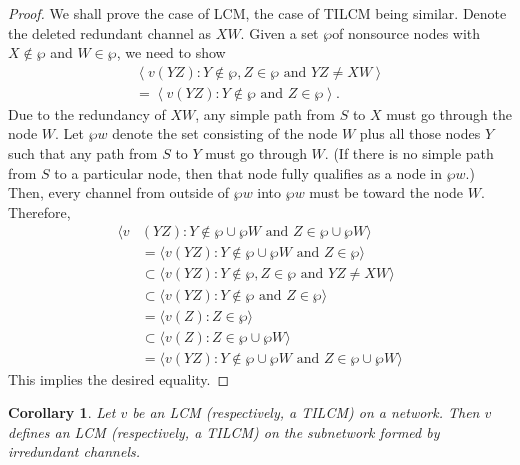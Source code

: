 \documentclass[journal]{IEEEtran}
\newtheorem*{proof}{\hskip 2em Proof}
\newtheorem{coro}[prop]{Corollary}
\begin{document}
\begin{proof}
	We shall prove the case of LCM, the case of TILCM being similar. Denote the deleted redundant channel as $XW$. Given a set $\wp$of nonsource nodes with $X\notin \wp$ and $W\in\wp$, we need to show
	\begin{multline*}
	\left \langle v(YZ):Y\notin \wp,Z\in\wp \text{ and }YZ\neq XW \right \rangle\\
	=\left \langle v(YZ):Y\notin \wp \text{ and }Z\in\wp\right \rangle.
	\end{multline*}
	Due to the redundancy of $XW$, any simple path from $S$ to $X$ must go through the node $W$. Let $\wp w$ denote the set consisting of the node $W$ plus all those nodes $Y$ such that any path from $S$ to $Y$ must go through $W$. (If there is no simple path from $S$ to a particular node, then that node fully qualifies as a node in $\wp w$.) Then, every channel from outside of $\wp w$ into $\wp w$ must be toward the node $W$. Therefore,
	\begin{equation*}\begin{split}
	 \langle v & (YZ):Y\notin \wp \cup\wp W\text{ and } Z\in \wp \cup \wp W \rangle\\
	 & =  \langle v(YZ):Y\notin\wp\cup\wp W\text{ and } Z\in\wp  \rangle\\
	 & \subset  \langle v(YZ):Y\notin\wp,Z\in\wp \text{ and } YZ\neq XW  \rangle\\
	 & \subset  \langle v(YZ):Y\notin \wp \text{ and }Z\in \wp  \rangle\\
	 & = \langle v(Z):Z\in \wp \rangle\\
	 & \subset \langle v(Z):Z\in \wp \cup \wp W \rangle\\
	 & =\langle v(YZ):Y\notin \wp\cup\wp W \text{ and }Z\in\wp\cup\wp W \rangle
	\end{split}\end{equation*}
	This implies the desired equality.
\end{proof}


\begin{coro}
	Let $v$ be an LCM (respectively, a TILCM) on a network. Then $v$ defines an LCM (respectively, a TILCM) on the subnetwork formed by irredundant channels.
\end{coro}
\vspace{\baselineskip}
\end{document}
